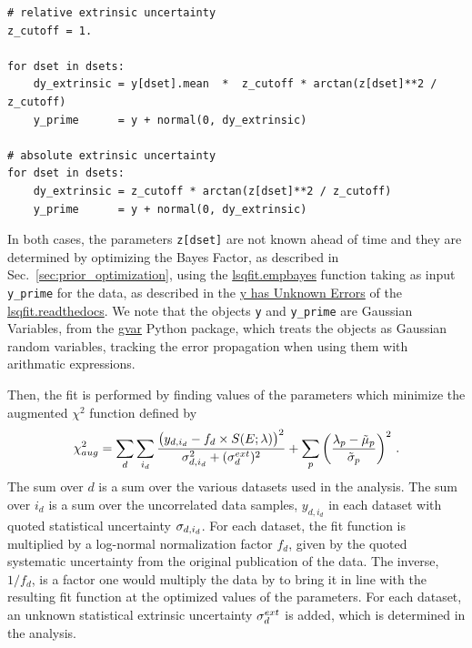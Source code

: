 \documentclass[prd,10pt,superscriptaddress,notitlepage,tightenlines,nofootinbib,floatfix]{revtex4-1}
\begin{document}
\begin{verbatim}
# relative extrinsic uncertainty
z_cutoff = 1.

for dset in dsets:
    dy_extrinsic = y[dset].mean  *  z_cutoff * arctan(z[dset]**2 / z_cutoff)
    y_prime      = y + normal(0, dy_extrinsic)

# absolute extrinsic uncertainty
for dset in dsets:
    dy_extrinsic = z_cutoff * arctan(z[dset]**2 / z_cutoff)
    y_prime      = y + normal(0, dy_extrinsic)
\end{verbatim}
In both cases, the parameters \texttt{z[dset]} are not known ahead of time and they are determined by optimizing the Bayes Factor, as described in Sec.~\ref{sec:prior_optimization}, using the \href{https://lsqfit.readthedocs.io/en/latest/lsqfit.html?highlight=empbayes#lsqfit.empbayes_fit}{lsqfit.empbayes} function taking as input \texttt{y\_prime} for the data, as described in the \href{https://lsqfit.readthedocs.io/en/latest/overview.html?highlight=unknown#y-has-unknown-errors}{y has Unknown Errors} of the \href{https://lsqfit.readthedocs.io/}{lsqfit.readthedocs}.
We note that the objects \texttt{y} and \texttt{y\_prime} are Gaussian Variables, from the \href{https://github.com/gplepage/gvar}{gvar} Python package, which treats the objects as Gaussian random variables, tracking the error propagation when using them with arithmatic expressions.

Then, the fit is performed by finding values of the parameters which minimize the augmented $\chi^2$ function defined by
\begin{equation}
\chi^2_{aug} = \sum_{d} \sum_{i_d} 
    \frac{\big( y_{d,i_d} - f_d \times S(E; \lambda) \big)^2}{{\sigma}_{d,i_d}^2 + ({\sigma}_d^{ext})^2}
    +\sum_p \left( \frac{{\lambda}_p - \tilde{\mu}_p}{\tilde{{\sigma}}_p} \right)^2\, .
\end{equation}
The sum over $d$ is a sum over the various datasets used in the analysis.
The sum over $i_d$ is a sum over the uncorrelated data samples, $y_{d,i_d}$ in each dataset with quoted statistical uncertainty ${\sigma}_{d,i_d}$.
For each dataset, the fit function is multiplied by a log-normal normalization factor $f_d$, given by the quoted systematic uncertainty from the original publication of the data.
The inverse, $1/f_d$, is a factor one would multiply the data by to bring it in line with the resulting fit function at the optimized values of the parameters.
For each dataset, an unknown statistical extrinsic uncertainty ${\sigma}_d^{ext}$ is added, which is determined in the analysis.
\end{document}

